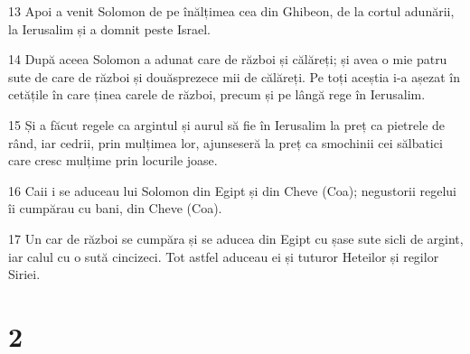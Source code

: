 \par 13 Apoi a venit Solomon de pe înălțimea cea din Ghibeon, de la cortul adunării, la Ierusalim și a domnit peste Israel.
\par 14 După aceea Solomon a adunat care de război și călăreți; și avea o mie patru sute de care de război și douăsprezece mii de călăreți. Pe toți aceștia i-a așezat în cetățile în care ținea carele de război, precum și pe lângă rege în Ierusalim.
\par 15 Și a făcut regele ca argintul și aurul să fie în Ierusalim la preț ca pietrele de rând, iar cedrii, prin mulțimea lor, ajunseseră la preț ca smochinii cei sălbatici care cresc mulțime prin locurile joase.
\par 16 Caii i se aduceau lui Solomon din Egipt și din Cheve (Coa); negustorii regelui îi cumpărau cu bani, din Cheve (Coa).
\par 17 Un car de război se cumpăra și se aducea din Egipt cu șase sute sicli de argint, iar calul cu o sută cincizeci. Tot astfel aduceau ei și tuturor Heteilor și regilor Siriei.

\chapter{2}

